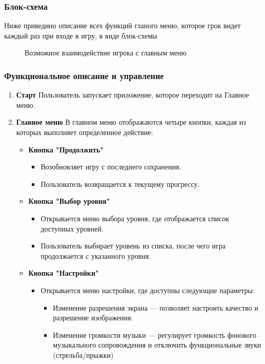 \documentclass{article}
\begin{document}
\subsubsection{Блок-схема}
Ниже приведино описание всех функций гланого меню, которое грок видет каждый раз при входе в игру, в виде блок-схемы

\begin{figure}[h]
    \caption{Возможное взаимодействие игрока с главным меню}
    \label{ris:image}
\end{figure}

\subsubsection{Функциональное описание и управление}
\begin{enumerate}
	\item \textbf{Старт} 
	Пользователь запускает приложение, которое переходит на Главное меню.
	\item \textbf{Главное меню} В главном меню отображаются четыре кнопки, каждая из которых выполняет определенное действие:
	\begin{itemize}
		\item \textbf{Кнопка "Продолжить"}
		\begin{itemize}
			\item Возобновляет игру с последнего сохранения.
			\item Пользователь возвращается к текущему прогрессу.
		\end{itemize}
		\item \textbf{Кнопка "Выбор уровня"}
		\begin{itemize}
			\item Открывается меню выбора уровня, где отображается список доступных уровней.
			\item Пользователь выбирает уровень из списка, после чего игра продолжается с указанного уровня.
		\end{itemize}
		\item \textbf{Кнопка "Настройки"}
		\begin{itemize}
			\item Открывается меню настройки, где доступны следующие параметры:
			\begin{itemize}
				\item Изменение разрешения экрана — позволяет настроить качество и разрешение изображения.
				\item Изменение громкости музыки — регулирует громкость фонового музыкального сопровождения и отключить функциональные звуки (стрельба/прыжки)

\end{itemize}
\end{itemize}
\end{itemize}
\end{enumerate}
\end{document}
